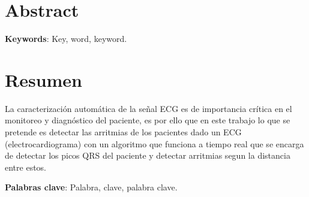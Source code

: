 \chapter*{Abstract}

	\Blindtext[8]
    
    \textbf{Keywords}: Key, word, keyword.



\chapter*{Resumen}

	La caracterización automática de la señal ECG es de importancia crítica 
	en el monitoreo y diagnóstico del paciente, es por ello que en este trabajo 
	lo que se pretende es detectar las arritmias de los pacientes dado un ECG 
	(electrocardiograma) con un algoritmo que funciona a tiempo real que se encarga
	de detectar los picos QRS del paciente y detectar arritmias segun la distancia entre estos.

    \textbf{Palabras clave}: Palabra, clave, palabra clave.